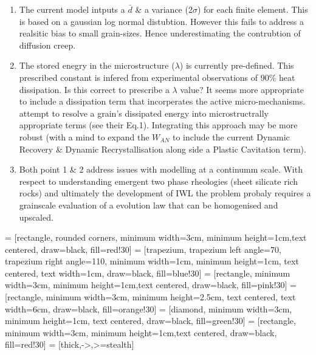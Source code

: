 \documentclass[]{scrreprt}
\begin{document}
\begin{enumerate}
\item The current model intputs a $\bar{d}$ \& a variance (2$\sigma$) for each finite element. This is based on a gaussian log normal distubtion. However this fails to address a realsitic bias to small grain-sizes. Hence underestimating the contrubtion of diffusion creep. 
\item The stored enegry in the microstructure ($\lambda$) is currently pre-defined. This prescribed constant is infered from experimental observations of 90\% heat dissipation. Is this correct to prescribe a $\lambda$ value? It seems more appropriate to include a dissipation term that incorperates the active micro-mechanisms. \citet{Huang2009} attempt to resolve a grain's dissipated energy into microstructrally appropriate terms (see their Eq.1). Integrating this approach may be more robust (with a mind to expand the $W_{AN}$ to include the current Dynamic Recovery \& Dynamic Recrystallisation along side a Plastic Cavitation term).
\item Both point 1 \& 2 address issues with modelling at a continumm scale. With respect to understanding emergent two phase rheologies (sheet silicate rich rocks) and ultimately the development of IWL \citep{Handy1994} the problem probaly requires a grainscale evaluation of a evolution law that can be homogenised and upscaled.
\end{enumerate}

 = [rectangle, rounded corners, minimum width=3cm, minimum height=1cm,text centered, draw=black, fill=red!30]
 = [trapezium, trapezium left angle=70, trapezium right angle=110, minimum width=1cm, minimum height=1cm, text centered, text width=1cm, draw=black, fill=blue!30]
 = [rectangle, minimum width=3cm, minimum height=1cm,text centered, draw=black, fill=pink!30]
 = [rectangle, minimum width=3cm, minimum height=2.5cm, text centered, text width=6cm, draw=black, fill=orange!30]
 = [diamond, minimum width=3cm, minimum height=1cm, text centered, draw=black, fill=green!30]
 = [rectangle, minimum width=3cm, minimum height=1cm,text centered, draw=black, fill=red!30]
 = [thick,->,>=stealth]
\end{document}
